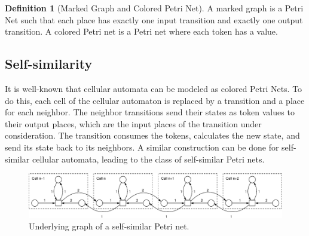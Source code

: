 \documentclass[pre,showpacs,showkeys,preprint]{revtex4}
\theoremstyle{definition}
\newtheorem{defn}{Definition}
\begin{document}
\begin{defn}[Marked Graph and Colored Petri Net]
A marked graph is a Petri Net such that each place has exactly one input transition and
exactly one output transition.
A colored Petri net is a Petri net where each token has a value.
\end{defn}

\subsection{Self-similarity}

It is well-known that cellular automata can be modeled as colored Petri Nets.
To do this, each cell of the cellular automaton is replaced by a transition and a place for each neighbor.
The neighbor transitions send their states as token values to their output places, which
are the input places of the transition under consideration.
The transition consumes the tokens, calculates the  new state, and send its state back to
its neighbors.
A similar construction can be done for self-similar cellular automata, leading
to the class of self-similar Petri nets.

\begin{figure}
\begin{center}
\includegraphics[scale=0.6]{2008-sica-RcaPetri.eps}
\caption{\label{petri} Underlying graph of a self-similar Petri net.}
\end{center}
\end{figure}
\end{document}
